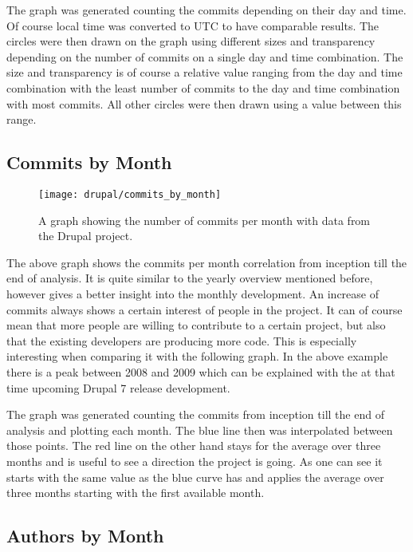 The graph was generated counting the commits depending on their day and time.
Of course local time was converted to \ac{UTC} to have comparable results. The
circles were then drawn on the graph using different sizes and transparency
depending on the number of commits on a single day and time combination. The
size and transparency is of course a relative value ranging from the day and
time combination with the least number of commits to the day and time
combination with most commits. All other circles were then drawn using a value
between this range.


\subsection{Commits by Month} %

\begin{figure}[h!t]
  \centering
  \texttt{[image: drupal/commits\_by\_month]}
  \caption{A graph showing the number of commits per month with data from the
  Drupal project.}
\end{figure}

The above graph shows the commits per month correlation from inception till the
end of analysis. It is quite similar to the yearly overview mentioned before,
however gives a better insight into the monthly development. An increase of
commits always shows a certain interest of people in the project. It can of
course mean that more people are willing to contribute to a certain project,
but also that the existing developers are producing more code. This is
especially interesting when comparing it with the following graph. In the above
example there is a peak between 2008 and 2009 which can be explained with the
at that time upcoming Drupal 7 release development.

The graph was generated counting the commits from inception till the end of
analysis and plotting each month. The blue line then was interpolated between
those points. The red line on the other hand stays for the average over three
months and is useful to see a direction the project is going. As one can see it
starts with the same value as the blue curve has and applies the average over
three months starting with the first available month.


\subsection{Authors by Month} %

